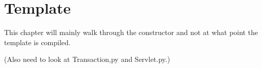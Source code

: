 \section{Template}
\label{template}

This chapter will mainly walk through the  constructor
and not at what point the template is compiled.

(Also need to look at Transaction,py and Servlet.py.)

